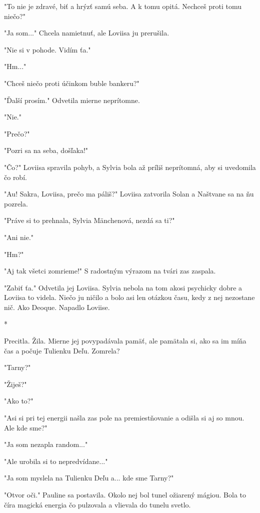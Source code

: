 \documentclass{book}
\begin{document}
"$ $To nie je zdravé, biť a hrýzť samú seba. A k tomu opitá. Nechceš proti tomu niečo?"$ $ 

"$ $Ja som..."$ $  Chcela namietnuť, ale Loviisa ju prerušila.

"$ $Nie si v pohode. Vidím ťa."$ $ 

"$ $Hm..."$ $ 

"$ $Chceš niečo proti účinkom buble bankeru?"$ $ 

"$ $Ďalší prosím."$ $  Odvetila mierne neprítomne.

"$ $Nie."$ $ 

"$ $Prečo?"$ $ 

"$ $Pozri sa na seba, došľaka!"$ $ 

"$ $Čo?"$ $  Loviisa spravila pohyb, a Sylvia bola až príliš neprítomná, aby si uvedomila čo robí.

"$ $Au! Sakra, Loviisa, prečo ma páliš?"$ $  Loviisa zatvorila Solan a Naštvane sa na ňu pozrela.

"$ $Práve si to prehnala, Sylvia Mänchenová, nezdá sa ti?"$ $ 

"$ $Ani nie."$ $ 

"$ $Hm?"$ $ 

"$ $Aj tak všetci zomrieme!"$ $  S radostným výrazom na tvári zas zaspala.

"$ $Zabiť ťa."$ $  Odvetila jej Loviisa. Sylvia nebola na tom akosi psychicky dobre a Loviisa to videla. Niečo ju ničilo a bolo asi len otázkou času, kedy z nej nezostane nič. Ako Deoque. Napadlo Loviise.

\begin{center}

*

\end{center}

Precitla. Žila. Mierne jej povypadávala pamäť, ale pamätala si, ako sa im míňa čas a počuje Tulienku Deľu. Zomrela?

"$ $Tarny?"$ $ 

"$ $Žiješ?"$ $ 

"$ $Ako to?"$ $ 

"$ $Asi si pri tej energii našla zas pole na premiestňovanie a odišla si aj so mnou. Ale kde sme?"$ $ 

"$ $Ja som nezapla random..."$ $ 

"$ $Ale urobila si to nepredvídane..."$ $ 

"$ $Ja som myslela na Tulienku Deľu a... kde sme Tarny?"$ $ 

"$ $Otvor oči."$ $  Pauline sa postavila. Okolo nej bol tunel ožiarený mágiou. Bola to číra magická energia čo pulzovala a vlievala do tunelu svetlo.
\end{document}
